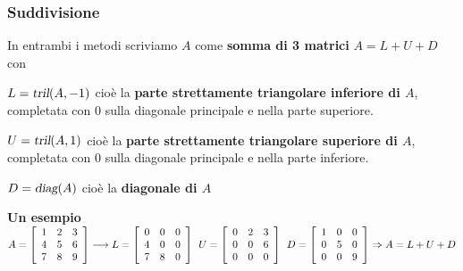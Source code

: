 \documentclass[10pt]{book}
\begin{document}
\subsubsection{Suddivisione}
In entrambi i metodi scriviamo $A$ come \textbf{somma di 3 matrici} $A = L + U + D$ con \begin{list}{}{}
	\item $L = \textsl{tril}(A, -1)$ cioè la \textbf{parte strettamente triangolare inferiore di $A$}, completata con 0 sulla diagonale principale e nella parte superiore.
	\item $U = \textsl{tril}(A, 1)$ cioè la \textbf{parte strettamente triangolare superiore di $A$}, completata con 0 sulla diagonale principale e nella parte inferiore.
	\item $D = \textsl{diag}(A)$ cioè la \textbf{diagonale di $A$}
\end{list}
\textbf{Un esempio}\\
$A = \left[\begin{array}{c c c}
1&2&3\\4&5&6\\7&8&9
\end{array}\right] \longrightarrow L = \left[\begin{array}{c c c}
0&0&0\\4&0&0\\7&8&0
\end{array}\right] \:\: U = \left[\begin{array}{c c c}
0&2&3\\0&0&6\\0&0&0
\end{array}\right] \:\: D = \left[\begin{array}{c c c}
1&0&0\\0&5&0\\0&0&9
\end{array}\right] \Rightarrow A = L+U+D$
\end{document}
